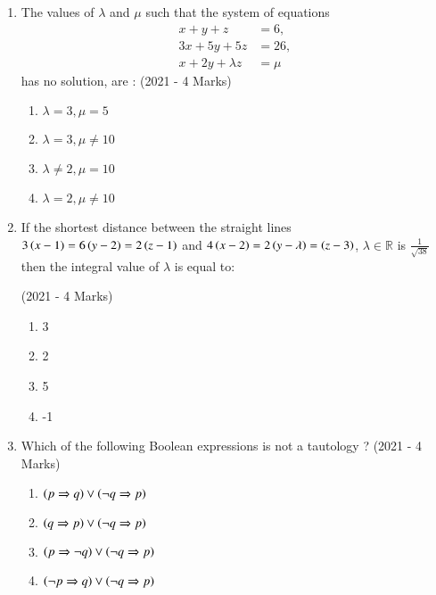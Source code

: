 \documentclass[journal]{IEEEtran}
\begin{document}
\begin{enumerate}
{		}
    \item{
            The values of $\lambda$ and $\mu$ such that the system of equations 
            \begin{align*}
            	x+y+z &= 6, \\
            	3x+5y+5z &= 26, \\
            	x + 2y + \lambda z &= \mu
            \end{align*}
            has no solution, are : \text{ }
             \hfill
                {(2021 - 4 Marks)}
            \begin{multicols}{4}
                \begin{enumerate}
                	\item $\lambda = 3, \mu = 5$
                    \item $\lambda = 3, \mu \neq 10$
                    \item $\lambda \neq 2, \mu = 10$
                    \item $\lambda = 2, \mu \neq 10$
                \end{enumerate}
            \end{multicols}

        
        }
    \item{
            If the shortest distance between the straight lines $3\left(x-1\right)=6\left(y-2\right)=2\left(z-1\right)$ and $4\left(x-2\right)=2\left(y-\lambda\right)=\left(z-3\right)$, $\lambda \in \mathbb{R}$ is $\frac{1}{\sqrt{38}}$then the integral value of $\lambda$ is equal to:
            
             \hfill
                {(2021 - 4 Marks)}
            \begin{multicols}{4}
                \begin{enumerate}
                	\item 3
                	\item 2
                	\item 5
                	\item -1
                \end{enumerate}
            \end{multicols}
        
        }
    \item{
            Which of the following Boolean expressions is not a tautology ?
             \hfill
                {(2021 - 4 Marks)}
			\begin{multicols}{2}
				\begin{enumerate}
					\item $\left(p \Rightarrow q\right) \lor \left(\neg q \Rightarrow p\right)$
					\item $\left(q \Rightarrow p\right) \lor \left(\neg q \Rightarrow p\right)$
					\item $\left(p \Rightarrow \neg q\right) \lor \left(\neg q \Rightarrow p\right)$
					\item $\left(\neg p \Rightarrow q\right) \lor \left(\neg q \Rightarrow p\right)$
				\end{enumerate}
			\end{multicols}
        
}
\end{enumerate}
\end{document}
